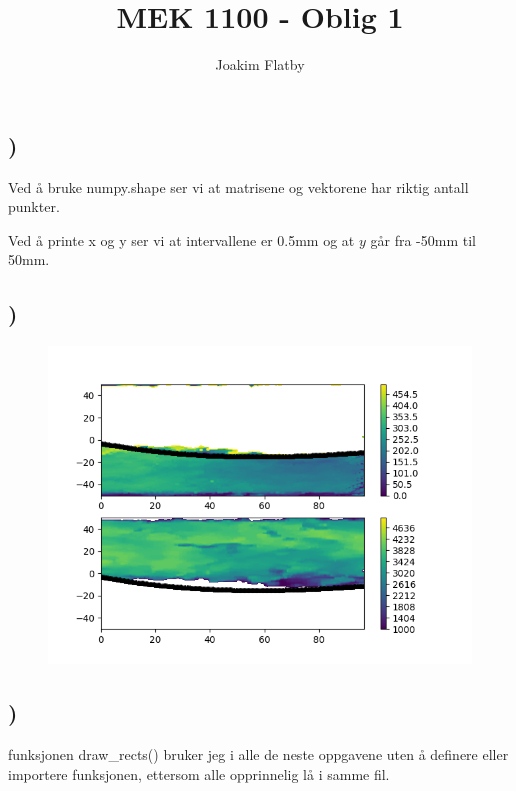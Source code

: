 \documentclass[a4paper,10pt,norsk]{article}
\title{MEK 1100 - Oblig 1}
\author{Joakim Flatby}
\begin{document}
\maketitle

\section{}

\subsection{)}
Ved å bruke numpy.shape ser vi at matrisene og vektorene har riktig antall punkter.

Ved å printe x og y ser vi at intervallene er 0.5mm og at $y$ går fra -50mm til 50mm.


\subsection{)}



\begin{figure}[h!]
        \centering 
        \includegraphics[scale=0.9]{oppg_b.png} 
\end{figure}

\subsection{)}


funksjonen draw\_rects() bruker jeg i alle de neste oppgavene uten å definere eller importere funksjonen, ettersom alle opprinnelig lå i samme fil.
\end{document}
